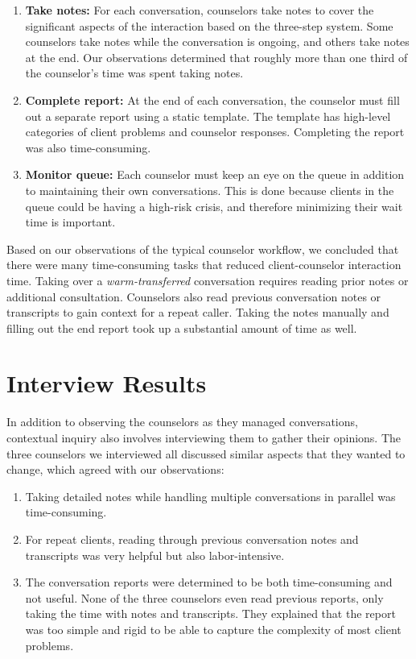 \begin{enumerate}
\begin{enumerate}
  \end{enumerate}
  \item \textbf{Take notes:} For each conversation, counselors take notes to cover the significant aspects of the interaction based on the three-step system. Some counselors take notes while the conversation is ongoing, and others take notes at the end. Our observations determined that roughly more than one third of the counselor's time was spent taking notes.
  \item \textbf{Complete report:} At the end of each conversation, the counselor must fill out a separate report using a static template. The template has high-level categories of client problems and counselor responses. Completing the report was also time-consuming.
  \item \textbf{Monitor queue:} Each counselor must keep an eye on the queue in addition to maintaining their own conversations. This is done because clients in the queue could be having a high-risk crisis, and therefore minimizing their wait time is important.
\end{enumerate}

Based on our observations of the typical counselor workflow, we concluded that there were many time-consuming tasks that reduced client-counselor interaction time. Taking over a \textit{warm-transferred} conversation requires reading prior notes or additional consultation. Counselors also read previous conversation notes or transcripts to gain context for a repeat caller. Taking the notes manually and filling out the end report took up a substantial amount of time as well.

\section{Interview Results}

In addition to observing the counselors as they managed conversations, contextual inquiry also involves interviewing them to gather their opinions. The three counselors we interviewed all discussed similar aspects that they wanted to change, which agreed with our observations:

\begin{enumerate}
  \item Taking detailed notes while handling multiple conversations in parallel was time-consuming.
  \item For repeat clients, reading through previous conversation notes and transcripts was very helpful but also labor-intensive.
  \item The conversation reports were determined to be both time-consuming and not useful. None of the three counselors even read previous reports, only taking the time with notes and transcripts. They explained that the report was too simple and rigid to be able to capture the complexity of most client problems.
\end{enumerate}

